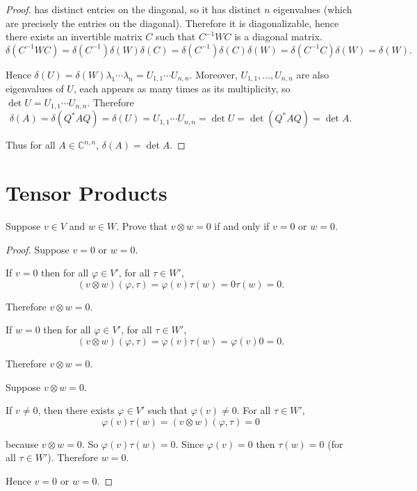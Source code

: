 \begin{proof}
    has distinct entries on the diagonal, so it has distinct $n$ eigenvalues (which are precisely the entries on the diagonal). Therefore it is diagonalizable, hence there exists an invertible matrix $C$ such that $C^{-1}WC$ is a diagonal matrix.
    \[
        \delta(C^{-1}WC) = \delta(C^{-1})\delta(W)\delta(C) = \delta(C^{-1})\delta(C)\delta(W) = \delta(C^{-1}C)\delta(W) = \delta(W).
    \]

    Hence $\delta(U) = \delta(W)\lambda_{1}\cdots\lambda_{n} = U_{1,1}\cdots U_{n,n}$. Moreover, $U_{1,1}, \ldots, U_{n,n}$ are also eigenvalues of $U$, each appears as many times as its multiplicity, so $\det U =  U_{1,1}\cdots U_{n,n}$. Therefore
    \[
        \delta(A) = \delta(Q^{*}AQ) = \delta(U) = U_{1,1}\cdots U_{n,n} = \det U = \det (Q^{*}AQ) = \det A.
    \]

    Thus for all $A\in\mathbb{C}^{n,n}$, $\delta(A) = \det A$.
\end{proof}
\newpage

\section{Tensor Products}

\begin{exercise}\label{chapter9:sectionD:exercise1}
    Suppose $v\in V$ and $w\in W$. Prove that $v\otimes w = 0$ if and only if $v = 0$ or $w = 0$.
\end{exercise}

\begin{proof}
    Suppose $v = 0$ or $w = 0$.

    If $v = 0$ then for all $\varphi\in V'$, for all $\tau\in W'$,
    \[
        (v\otimes w)(\varphi, \tau) = \varphi(v)\tau(w) = 0\tau(w) = 0.
    \]

    Therefore $v\otimes w = 0$.

    If $w = 0$ then for all $\varphi\in V'$, for all $\tau\in W'$,
    \[
        (v\otimes w)(\varphi, \tau) = \varphi(v)\tau(w) = \varphi(v)0 = 0.
    \]

    Therefore $v\otimes w = 0$.

    \bigskip
    Suppose $v\otimes w = 0$.

    If $v\ne 0$, then there exists $\varphi\in V'$ such that $\varphi(v)\ne 0$. For all $\tau\in W'$,
    \[
        \varphi(v)\tau(w) = (v\otimes w)(\varphi, \tau) = 0
    \]

    because $v\otimes w = 0$. So $\varphi(v)\tau(w) = 0$. Since $\varphi(v) = 0$ then $\tau(w) = 0$ (for all $\tau\in W'$). Therefore $w = 0$.

    Hence $v = 0$ or $w = 0$.
\end{proof}
\newpage

